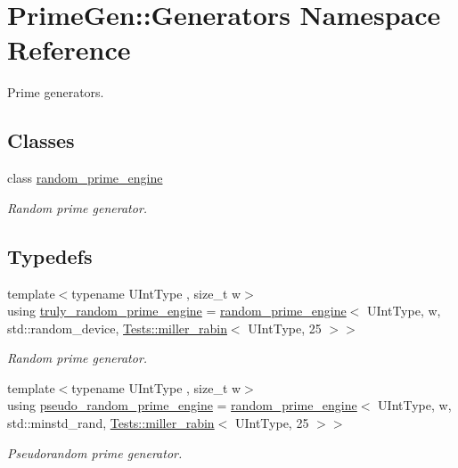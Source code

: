 \hypertarget{namespace_prime_gen_1_1_generators}{\section{Prime\+Gen\+:\+:Generators Namespace Reference}
\label{namespace_prime_gen_1_1_generators}
}


Prime generators.  


\subsection*{Classes}
\begin{DoxyCompactItemize}
\item 
class \hyperlink{class_prime_gen_1_1_generators_1_1random__prime__engine}{random\+\_\+prime\+\_\+engine}
\begin{DoxyCompactList}\small\item\em Random prime generator. \end{DoxyCompactList}\end{DoxyCompactItemize}
\subsection*{Typedefs}
\begin{DoxyCompactItemize}
\item 
{\footnotesize template$<$typename U\+Int\+Type , size\+\_\+t w$>$ }\\using \hyperlink{namespace_prime_gen_1_1_generators_a49f5680053be25ced5f6b2cf3a49cd4e}{truly\+\_\+random\+\_\+prime\+\_\+engine} = \hyperlink{class_prime_gen_1_1_generators_1_1random__prime__engine}{random\+\_\+prime\+\_\+engine}$<$ U\+Int\+Type, w, std\+::random\+\_\+device, \hyperlink{namespace_prime_gen_1_1_tests_ab4ab789bde1badebff58de914a31afb3}{Tests\+::miller\+\_\+rabin}$<$ U\+Int\+Type, 25 $>$$>$
\begin{DoxyCompactList}\small\item\em Random prime generator. \end{DoxyCompactList}\item 
{\footnotesize template$<$typename U\+Int\+Type , size\+\_\+t w$>$ }\\using \hyperlink{namespace_prime_gen_1_1_generators_ab90cf6ac663308b430053823ec13564b}{pseudo\+\_\+random\+\_\+prime\+\_\+engine} = \hyperlink{class_prime_gen_1_1_generators_1_1random__prime__engine}{random\+\_\+prime\+\_\+engine}$<$ U\+Int\+Type, w, std\+::minstd\+\_\+rand, \hyperlink{namespace_prime_gen_1_1_tests_ab4ab789bde1badebff58de914a31afb3}{Tests\+::miller\+\_\+rabin}$<$ U\+Int\+Type, 25 $>$$>$
\begin{DoxyCompactList}\small\item\em Pseudorandom prime generator. \end{DoxyCompactList}\end{DoxyCompactItemize}
